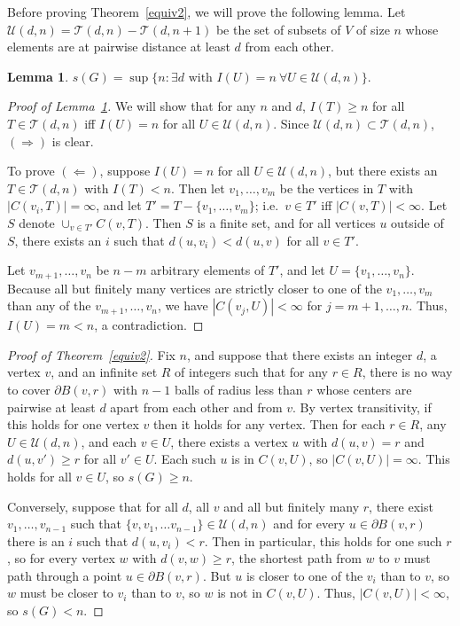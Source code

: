 \documentclass[11pt]{article}
\newtheorem{lemma}{Lemma}
\newcommand{\T}{\mathcal{T}}
\newcommand{\U}{\mathcal{U}}
\begin{document}
Before proving Theorem~\ref{equiv2}, we will prove the following lemma. Let $\U(d,n) = \T(d,n) - \T(d,n+1)$ be the set of subsets of $V$ of size $n$ whose elements are at pairwise distance at least $d$ from each other. 
\begin{lemma} \label{equiv1}
$s(G) = \sup \{n : \exists d \mbox{ with }I(U) = n\ \forall U\in \U(d,n)\}.$
\end{lemma}
\begin{proof}[Proof of Lemma~\ref{equiv1}]
We will show that for any $n$ and $d$, $I(T) \geq n$ for all $T \in \T(d,n)$ iff $I(U) = n$ for all $U \in \U(d,n)$. Since $\U(d,n) \subset \T(d,n)$, $(\Rightarrow)$ is clear. 

To prove $(\Leftarrow)$, suppose $I(U) = n$ for all $U \in \U(d,n)$, but there exists an $T \in \T(d,n)$ with $I(T)<n$. Then let $v_1, \ldots , v_m$ be the vertices in $T$ with $|C(v_i, T)| = \infty$, and let $T' = T - \{v_1, \ldots , v_m\}$; i.e.\ $v \in T'$ iff $|C(v,T)|< \infty$. Let $S$ denote $\cup_{v \in T'}C(v,T)$. Then $S$ is a finite set, and for all vertices $u$ outside of $S$, there exists an $i$ such that $d(u, v_i) < d(u,v)$ for all $v \in T'$.

Let $v_{m+1}, \ldots , v_n$ be $n-m$ arbitrary elements of $T'$, and let $U = \{v_1, \ldots , v_n\}$. Because all but finitely many vertices are strictly closer to one of the $v_1, \ldots , v_m$ than any of the $v_{m+1}, \ldots , v_n$, we have $|C(v_j,U)| < \infty$ for $j = m+1, \ldots, n$. Thus, $I(U) = m < n$, a contradiction.
\end{proof}

\begin{proof}[Proof of Theorem~\ref{equiv2}]
Fix $n$, and suppose that there exists an integer $d$, a vertex $v$, and an infinite set $R$ of integers such that for any $r \in R$, there is no way to cover $\partial B(v,r)$ with $n-1$ balls of radius less than $r$ whose centers are pairwise at least $d$ apart from each other and from $v$. By vertex transitivity, if this holds for one vertex $v$ then it holds for any vertex. Then for each $r \in R$, any $U \in \U(d,n)$, and each $v \in U$, there exists a vertex $u$ with $d(u,v) = r$ and $d(u,v') \geq r$ for all $v' \in U$. Each such $u$ is in $C(v,U)$, so $|C(v,U)| = \infty$. This holds for all $v \in U$, so $s(G) \geq n$. 

Conversely, suppose that for all $d$, all $v$ and all but finitely many $r$, there exist $v_1, \ldots , v_{n-1}$ such that $\{v, v_1, \ldots v_{n-1}\} \in \U(d,n)$ and for every $u \in \partial B(v,r)$ there is an $i$ such that $d(u,v_i) < r$. Then in particular, this holds for one such $r$, so for every vertex $w$ with $d(v,w) \geq r$, the shortest path from $w$ to $v$ must path through a point $u \in \partial B(v,r)$. But $u$ is closer to one of the $v_i$ than to $v$, so $w$ must be closer to $v_i$ than to $v$, so $w$ is not in $C(v,U)$. Thus, $|C(v,U)| < \infty$, so $s(G) < n$.  
\end{proof}
\end{document}
